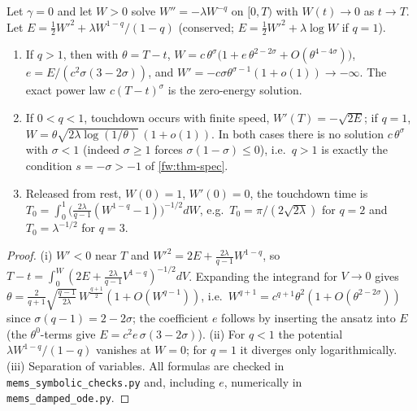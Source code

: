 \begin{proposition}\label{mems:prop-ode}
Let $\gamma=0$ and let $W>0$ solve $W''=-\lambda W^{-q}$ on $[0,T)$ with
$W(t)\to0$ as $t\to T$. Let $E=\tfrac12W'^2+\lambda W^{1-q}/(1-q)$ (conserved;
$E=\tfrac12 W'^2+\lambda\log W$ if $q=1$).
\begin{enumerate}[label=(\roman*),nosep]
\item If $q>1$, then with $\theta=T-t$,
  $W=c\,\theta^{\sigma}\big(1+e\,\theta^{2-2\sigma}+O(\theta^{4-4\sigma})\big)$,
  $e=E/(c^2\sigma(3-2\sigma))$, and $W'=-c\sigma\theta^{\sigma-1}(1+o(1))\to-\infty$.
  The exact power law $c(T-t)^\sigma$ is the zero-energy solution.
\item If $0<q<1$, touchdown occurs with finite speed, $W'(T)=-\sqrt{2E}$; if
  $q=1$, $W=\theta\sqrt{2\lambda\log(1/\theta)}\,(1+o(1))$. In both cases there is
  no solution $c\,\theta^{\sigma}$ with $\sigma<1$ (indeed $\sigma\ge1$ forces
  $\sigma(1-\sigma)\le0$), i.e.\ $q>1$ is exactly the condition $s=-\sigma>-1$
  of \cref{fw:thm-spec}.
\item Released from rest, $W(0)=1$, $W'(0)=0$, the touchdown time is
  $T_0=\int_0^1\big(\tfrac{2\lambda}{q-1}(W^{1-q}-1)\big)^{-1/2}dW$, e.g.\
  $T_0=\pi/(2\sqrt{2\lambda})$ for $q=2$ and $T_0=\lambda^{-1/2}$ for $q=3$.
\end{enumerate}
\end{proposition}

\begin{proof}
(i) $W'<0$ near $T$ and $W'^2=2E+\frac{2\lambda}{q-1}W^{1-q}$, so
$T-t=\int_0^W(2E+\frac{2\lambda}{q-1}V^{1-q})^{-1/2}dV$. Expanding the integrand
for $V\to0$ gives $\theta=\frac{2}{q+1}\sqrt{\frac{q-1}{2\lambda}}\,W^{\frac{q+1}2}
(1+O(W^{q-1}))$, i.e.\ $W^{q+1}=c^{q+1}\theta^2(1+O(\theta^{2-2\sigma}))$
since $\sigma(q-1)=2-2\sigma$; the coefficient $e$ follows by inserting the
ansatz into $E$ (the $\theta^0$-terms give $E=c^2e\,\sigma(3-2\sigma)$). (ii)
For $q<1$ the potential $\lambda W^{1-q}/(1-q)$ vanishes at $W=0$; for $q=1$
it diverges only logarithmically. (iii) Separation of variables. All formulas
are checked in \texttt{mems\_symbolic\_checks.py} and, including $e$,
numerically in \texttt{mems\_damped\_ode.py}.
\end{proof}

